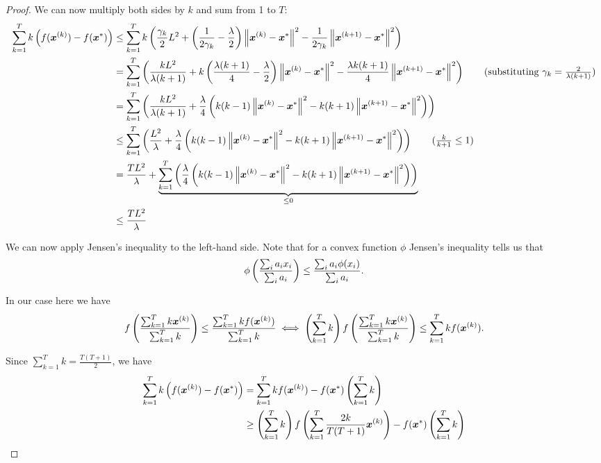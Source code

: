 \documentclass{article}
\begin{document}
{\begin{proof}
We can now multiply both sides by $k$ and sum from 1 to $T$:
\begin{align*}
    \sum_{k=1}^{T} k \parens{f(\vx^{(k)}) - f(\vx^\ast)} &\leq \sum_{k=1}^{T} k \parens{\frac{\gamma_k}{2} L^2 + \parens{\frac{1}{2\gamma_k} - \frac{\lambda}{2}} \norm{\vx^{(k)} - \vx^\ast}^2 - \frac{1}{2\gamma_k} \norm{\vx^{(k+1)} - \vx^\ast}^2} \\
    &= \sum_{k=1}^{T} \parens{\frac{k L^2}{\lambda (k+1)} + k\parens{\frac{\lambda (k+1)}{4} - \frac{\lambda}{2}} \norm{\vx^{(k)} - \vx^\ast}^2 - \frac{\lambda k(k+1)}{4} \norm{\vx^{(k+1)} - \vx^\ast}^2} \tag{substituting $\gamma_k = \frac{2}{\lambda(k+1)}$} \\
    &= \sum_{k=1}^{T} \parens{\frac{k L^2}{\lambda (k+1)} + \frac{\lambda}{4} \parens{k(k-1)\norm{\vx^{(k)} - \vx^\ast}^2 - k(k+1)\norm{\vx^{(k+1)} - \vx^\ast}^2}} \\
    &\leq \sum_{k=1}^{T} \parens{\frac{L^2}{\lambda} + \frac{\lambda}{4} \parens{k(k-1)\norm{\vx^{(k)} - \vx^\ast}^2 - k(k+1)\norm{\vx^{(k+1)} - \vx^\ast}^2}} \tag{$\frac{k}{k+1} \leq 1$} \\
    &= \frac{T L^2}{\lambda} + \underbrace{\sum_{k=1}^{T} \parens{\frac{\lambda}{4} \parens{k(k-1)\norm{\vx^{(k)} - \vx^\ast}^2 - k(k+1)\norm{\vx^{(k+1)} - \vx^\ast}^2}}}_{\leq 0} \\
    &\leq \frac{T L^2}{\lambda}
\end{align*}

We can now apply Jensen's inequality to the left-hand side. Note that for a convex function $\phi$ Jensen's inequality tells us that
\[
    \phi\left(\frac{\sum_i a_i x_i}{\sum_i a_i}\right) \leq \frac{\sum_i a_i \phi(x_i)}{\sum_i a_i}.
\]

In our case here we have
\begin{gather*}
    f\left(\frac{\sum_{k=1}^{T} k {\bm{x}}^{(k)}}{\sum_{k=1}^{T} k}\right) \leq \frac{\sum_{k=1}^{T} k f({\bm{x}}^{(k)})}{\sum_{k=1}^{T} k} \iff \left(\sum_{k=1}^{T} k\right) f\left(\frac{\sum_{k=1}^{T} k {\bm{x}}^{(k)}}{\sum_{k=1}^{T} k}\right) \leq \sum_{k=1}^{T} k f({\bm{x}}^{(k)}).
\end{gather*}

Since $\sum_{k=1}^{T} k = \frac{T(T+1)}{2}$, we have
\begin{align*}
    \sum_{k=1}^{T} k \left(f({\bm{x}}^{(k)}) - f({\bm{x}}^\ast)\right) &= \sum_{k=1}^{T} k f({\bm{x}}^{(k)}) - f({\bm{x}}^\ast) \left(\sum_{k=1}^{T} k\right) \\
    &\geq \left(\sum_{k=1}^{T} k\right) f\left(\sum_{k=1}^{T} \frac{2k}{T(T+1)} {\bm{x}}^{(k)}\right) - f({\bm{x}}^\ast) \left(\sum_{k=1}^{T} k\right)
\end{align*}


\end{proof}}
\end{document}
